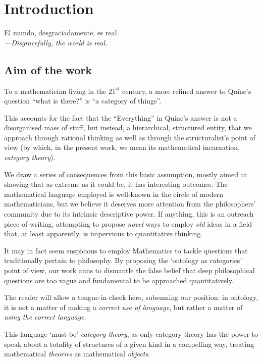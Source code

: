 \section{Introduction}\label{sec_intro}
\epigraph{El mundo, desgraciadamente, es real.\\[2mm]
\footnotesize\emph{---Disgracefully, the world is real.}
}{\cite{confutacion}}
\subsection{Aim of the work}
To a mathematician living in the $21^\text{st}$ century, a more refined answer to Quine's question \cite{quine1948there} ``what is there?'' is ``a category of things''. 

This accounts for the fact that the ``Everything'' in Quine's answer is not a disorganised mass of stuff, but instead, a hierarchical, structured entity, that we approach through rational thinking as well as through the structuralist's point of view (by which, in the present work, we mean its mathematical incarnation, \emph{category theory}).

We draw a series of consequences from this basic assumption, mostly aimed at showing that as extreme as it could be, it has interesting outcomes. The mathematical language employed is well-known in the circle of modern mathematicians, but we believe it deserves more attention from the philosophers' community due to its intrinsic descriptive power. If anything, this is an outreach piece of writing, attempting to propose \emph{novel} ways to employ \emph{old} ideas in a field that, at least apparently, is impervious to quantitative thinking. 

It may in fact seem suspicious to employ Mathematics to tackle questions that traditionally pertain to philosophy. By proposing the `ontology as categories' point of view, our work aims to dismantle the false belief that deep philosophical questions are too vague and fundamental to be approached quantitatively.

The reader will allow a tongue-in-cheek here, subsuming our position: in ontology, it is not a matter of making a \emph{correct use of language}, but rather a matter of \emph{using the correct language}.

This language `must be' \emph{category theory}, as only category theory has the power to speak about a totality of structures of a given kind in a compelling way, treating mathematical \emph{theories} as mathematical \emph{objects}.

